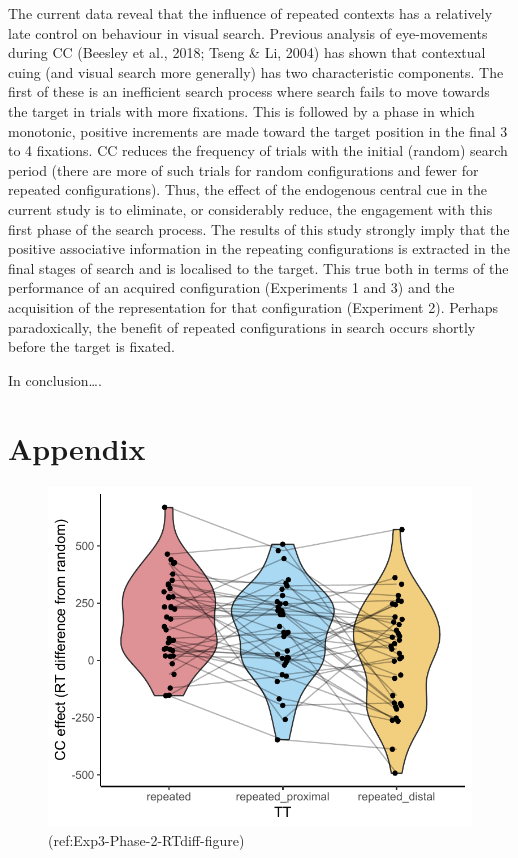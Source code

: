 \documentclass[
  man,floatsintext]{apa7}
\begin{document}
The current data reveal that the influence of repeated contexts has a relatively late control on behaviour in visual search. Previous analysis of eye-movements during CC (Beesley et al., 2018; Tseng \& Li, 2004) has shown that contextual cuing (and visual search more generally) has two characteristic components. The first of these is an inefficient search process where search fails to move towards the target in trials with more fixations. This is followed by a phase in which monotonic, positive increments are made toward the target position in the final 3 to 4 fixations. CC reduces the frequency of trials with the initial (random) search period (there are more of such trials for random configurations and fewer for repeated configurations). Thus, the effect of the endogenous central cue in the current study is to eliminate, or considerably reduce, the engagement with this first phase of the search process. The results of this study strongly imply that the positive associative information in the repeating configurations is extracted in the final stages of search and is localised to the target. This true both in terms of the performance of an acquired configuration (Experiments 1 and 3) and the acquisition of the representation for that configuration (Experiment 2). Perhaps paradoxically, the benefit of repeated configurations in search occurs shortly before the target is fixated.

In conclusion\ldots.

\newpage

\hypertarget{appendix}{%
\section{Appendix}\label{appendix}}

\begin{figure}

{\centering \includegraphics{CCC_ms1_files/figure-latex/Exp3-Phase-2-RTdiff-figure-1} 

}

\caption{(ref:Exp3-Phase-2-RTdiff-figure)}\label{fig:Exp3-Phase-2-RTdiff-figure}
\end{figure}
\end{document}
